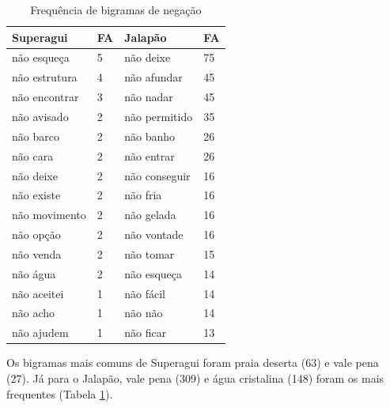 \documentclass[preprint, 3p,
authoryear]{elsarticle} %
\begin{document}
\begin{table}[!h]

\caption{\label{tab:tab3}\label{tab3}Frequência de bigramas de negação}
\centering
\begin{tabular}[t]{llll}
\toprule
\textbf{Superagui} & \textbf{FA} & \textbf{Jalapão} & \textbf{FA}\\
\midrule
não esqueça & 5 & não deixe & 75\\
não estrutura & 4 & não afundar & 45\\
não encontrar & 3 & não nadar & 45\\
não avisado & 2 & não permitido & 35\\
não barco & 2 & não banho & 26\\
\addlinespace
não cara & 2 & não entrar & 26\\
não deixe & 2 & não conseguir & 16\\
não existe & 2 & não fria & 16\\
não movimento & 2 & não gelada & 16\\
não opção & 2 & não vontade & 16\\
\addlinespace
não venda & 2 & não tomar & 15\\
não água & 2 & não esqueça & 14\\
não aceitei & 1 & não fácil & 14\\
não acho & 1 & não não & 14\\
não ajudem & 1 & não ficar & 13\\
\bottomrule
\end{tabular}
\end{table}

Os bigramas mais comuns de Superagui foram praia deserta (63) e vale
pena (27). Já para o Jalapão, vale pena (309) e água cristalina (148)
foram os mais frequentes (Tabela \ref{tab3}).
\end{document}
